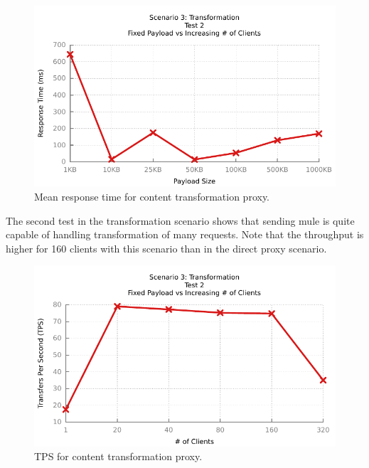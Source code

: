 \begin{figure}[htpb]
	\centerline{\includegraphics{img/transform_fu_ip_resp}}
	\caption{Mean response time for content transformation proxy.}
	\label{fig:transform-1-2}
\end{figure}

The second test in the transformation scenario shows that sending mule is quite capable of handling transformation of many requests. Note that the throughput is higher for 160 clients with this scenario than in the direct proxy scenario. 

\begin{figure}[htpb]
	\centerline{\includegraphics{img/transform_fp_iu_tps}}
	\caption{TPS for content transformation proxy.}
	\label{fig:transform-2-1}
\end{figure}

